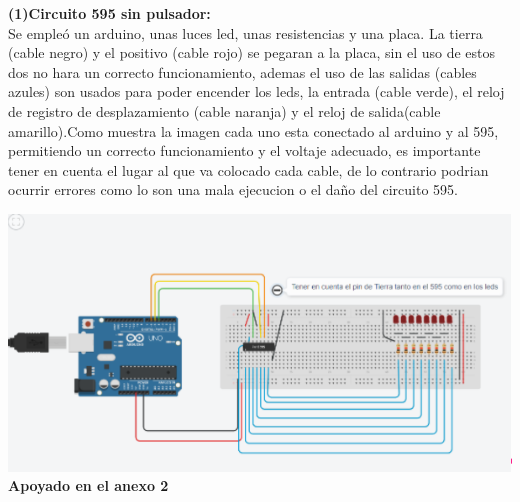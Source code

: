 \documentclass{article}
\begin{document}
\begin{justify}


\textbf{(1)Circuito 595 sin pulsador:}\\
Se empleó un arduino, unas luces led, unas resistencias y una placa. La tierra (cable negro) y el positivo (cable rojo) se pegaran a la placa, sin el uso de estos dos no hara un correcto funcionamiento, ademas el uso de las salidas (cables azules) son usados para poder encender los leds, la entrada (cable verde), el reloj de registro de desplazamiento (cable naranja) y el reloj de salida(cable amarillo).Como muestra la imagen cada uno esta conectado al arduino y al 595, permitiendo un correcto funcionamiento y el voltaje adecuado, es importante tener en cuenta el lugar al que va colocado cada cable, de lo contrario podrian ocurrir errores como lo son una mala ejecucion o el daño del circuito 595.
\end{justify}

\includegraphics[scale=0.5]{figura3.png}
\centering
\textbf{Apoyado en el anexo 2}
\newline
\newline
\newline


\newpage
\end{document}
